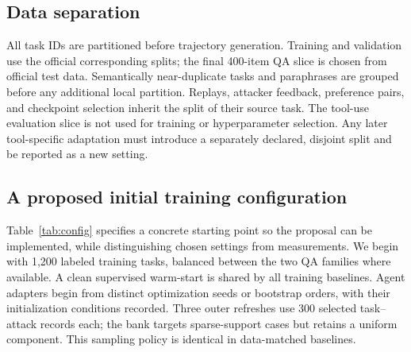 \documentclass[10pt,twocolumn]{article}
\begin{document}
\subsection{Data separation}
All task IDs are partitioned before trajectory generation. Training and validation use the official corresponding splits; the final 400-item QA slice is chosen from official test data. Semantically near-duplicate tasks and paraphrases are grouped before any additional local partition. Replays, attacker feedback, preference pairs, and checkpoint selection inherit the split of their source task. The tool-use evaluation slice is not used for training or hyperparameter selection. Any later tool-specific adaptation must introduce a separately declared, disjoint split and be reported as a new setting.

\subsection{A proposed initial training configuration}
Table~\ref{tab:config} specifies a concrete starting point so the proposal can be implemented, while distinguishing chosen settings from measurements. We begin with 1,200 labeled training tasks, balanced between the two QA families where available. A clean supervised warm-start is shared by all training baselines. Agent adapters begin from distinct optimization seeds or bootstrap orders, with their initialization conditions recorded. Three outer refreshes use 300 selected task--attack records each; the bank targets sparse-support cases but retains a uniform component. This sampling policy is identical in data-matched baselines.
\end{document}
